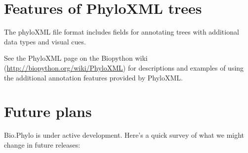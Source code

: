 \documentclass{report}
\begin{document}
\section{Features of PhyloXML trees}
\label{sec:PhyloXML}

The phyloXML file format includes fields for annotating trees with additional data types and
visual cues.


See the PhyloXML page on the Biopython wiki (\url{http://biopython.org/wiki/PhyloXML}) for
descriptions and examples of using the additional annotation features provided by PhyloXML.


\section{Future plans}
\label{sec:PhyloFuture}

Bio.Phylo is under active development. Here's a quick survey of what we might change in future
releases:
\end{document}
